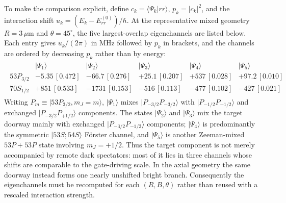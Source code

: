 To make the comparison explicit, define
$c_k=\langle\Psi_k|rr\rangle$, $p_k=|c_k|^2$, and the interaction shift
$u_k=(E_k-E_{rr}^{(0)})/\hbar$.  At the representative mixed geometry
$R=3\,\mu\mathrm{m}$ and $\theta=45^\circ$, the five largest-overlap
eigenchannels are listed below.  Each entry gives
$u_k/(2\pi)$ in MHz followed by $p_k$ in brackets, and the channels are
ordered by decreasing $p_k$ rather than by energy:
\begin{align}
\begin{array}{c|ccccc}
 & |\Psi_1\rangle & |\Psi_2\rangle & |\Psi_3\rangle
 & |\Psi_4\rangle & |\Psi_5\rangle \\
\hline
53P_{3/2}
 & -5.35\,[0.472] & -66.7\,[0.276] & +25.1\,[0.207]
 & +537\,[0.028] & +97.2\,[0.010] \\
70S_{1/2}
 & +851\,[0.533] & -1731\,[0.153] & -516\,[0.113]
 & -477\,[0.102] & -427\,[0.021]
\end{array}
\label{eq:bright-pair-channels-20g}
\end{align}
Writing $P_m\equiv|53P_{3/2},m_J=m\rangle$, $|\Psi_1\rangle$ mixes
$|P_{-3/2}P_{-3/2}\rangle$ with $|P_{-1/2}P_{-1/2}\rangle$ and exchanged
$|P_{-3/2}P_{+1/2}\rangle$ components.  The states $|\Psi_2\rangle$ and
$|\Psi_3\rangle$ mix the target doorway mainly with exchanged
$|P_{-3/2}P_{-1/2}\rangle$ components; $|\Psi_4\rangle$ is predominantly the
symmetric $|53S;54S\rangle$ F\"orster channel, and $|\Psi_5\rangle$ is another
Zeeman-mixed $53P+53P$ state involving $m_J=+1/2$.  Thus the target component
is not merely accompanied by remote dark
spectators: most of it lies in three channels whose shifts are comparable to
the gate-driving scale.  In the axial geometry the same doorway instead forms
one nearly unshifted bright branch.  Consequently the eigenchannels must be
recomputed for each $(R,B,\theta)$ rather than reused with a rescaled
interaction strength.

